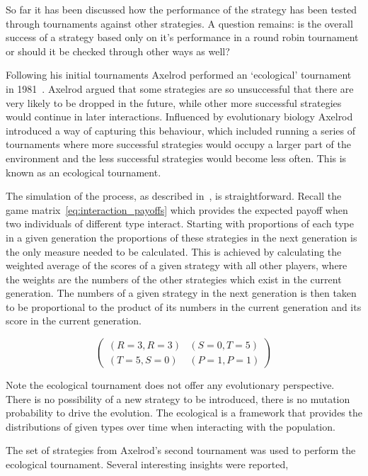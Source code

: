 \documentclass{article}
\begin{document}
So far it has been discussed how the performance of the strategy has been tested
through tournaments against other strategies. A question remains: is the overall
success of a strategy based only on it's performance in a round robin tournament
or should it be checked through other ways as well?

Following his initial tournaments Axelrod performed an `ecological' tournament
in 1981~\cite{Axelrod1984}. Axelrod argued that some strategies are so unsuccessful
that there are very likely to be dropped in the future, while other more successful
strategies would continue in later interactions. Influenced by evolutionary biology
Axelrod introduced a way of capturing this behaviour, which included running a
series of tournaments where more successful strategies would occupy a larger part
of the environment and the less successful strategies would become less often.
This is known as an ecological tournament. 

The simulation of the process, as described in~\cite{Axelrod1984}, is straightforward.
Recall the game matrix~\ref{eq:interaction_payoffs} which provides the expected payoff
when two individuals of different type interact. Starting with proportions of
each type in a given generation the proportions of these strategies in the next
generation is the only measure needed to be calculated. This is achieved by
calculating the weighted average of the scores of a given strategy with all
other players, where the weights are the numbers of the other strategies which
exist in the current generation. The numbers of a given strategy in the next
generation is then taken to be proportional to the product of its numbers in the
current generation and its score in the current generation.

\begin{equation} \label{eq:interaction_payoffs}
    \begin{pmatrix}
    (R=3, R=3) & (S=0, T=5) \\ (T=5, S=0) & (P=1, P=1)
    \end{pmatrix}
\end{equation}

Note the ecological tournament does not offer any evolutionary perspective.
There is no possibility of a new strategy to be introduced, there is no mutation 
probability to drive the evolution. The ecological is a framework that provides
the distributions of given types over time when interacting with the population.

The set of strategies from Axelrod's second tournament was used to perform the
ecological tournament. Several interesting insights were reported,
\end{document}
